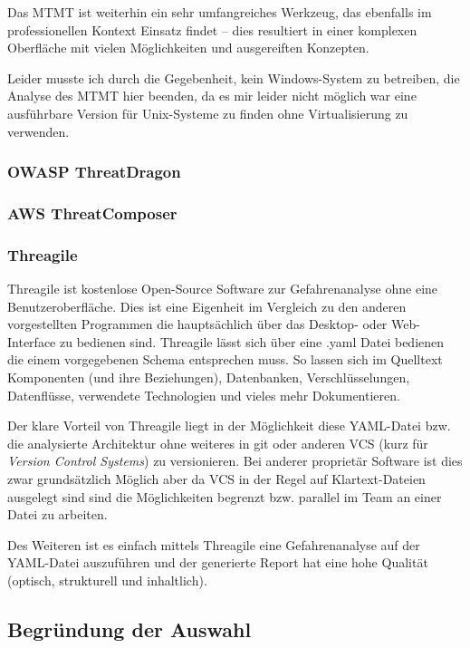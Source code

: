 \documentclass{article}
\begin{document}
Das MTMT ist weiterhin ein sehr umfangreiches Werkzeug, das ebenfalls im professionellen 
Kontext Einsatz findet – dies resultiert in einer komplexen Oberfläche mit 
vielen Möglichkeiten und ausgereiften Konzepten.

Leider musste ich durch die Gegebenheit, kein Windows-System zu betreiben, die Analyse 
des MTMT hier beenden, da es mir leider nicht möglich war eine ausführbare Version für 
Unix-Systeme zu finden ohne Virtualisierung zu verwenden.

\subsubsection*{OWASP ThreatDragon}

\subsubsection*{AWS ThreatComposer}

\subsubsection*{Threagile}

Threagile ist kostenlose Open-Source Software zur Gefahrenanalyse ohne eine 
Benutzeroberfläche. Dies ist eine Eigenheit im Vergleich zu den anderen vorgestellten 
Programmen die hauptsächlich über das Desktop- oder Web-Interface zu bedienen sind.
Threagile lässt sich über eine .yaml Datei bedienen die einem vorgegebenen Schema 
entsprechen muss. So lassen sich im Quelltext Komponenten (und ihre Beziehungen), 
Datenbanken, Verschlüsselungen, Datenflüsse, verwendete Technologien und vieles mehr 
Dokumentieren.

Der klare Vorteil von Threagile liegt in der Möglichkeit diese YAML-Datei bzw. die 
analysierte Architektur ohne weiteres in git oder anderen VCS (kurz für \textit{Version 
Control Systems}) zu versionieren. Bei anderer proprietär Software ist dies zwar 
grundsätzlich Möglich aber da VCS in der Regel auf Klartext-Dateien ausgelegt sind sind 
die Möglichkeiten begrenzt bzw. parallel im Team an einer Datei zu arbeiten.

Des Weiteren ist es einfach mittels Threagile eine Gefahrenanalyse auf der YAML-Datei 
auszuführen und der generierte Report hat eine hohe Qualität (optisch, strukturell und 
inhaltlich).

\subsection{Begründung der Auswahl}
\end{document}
